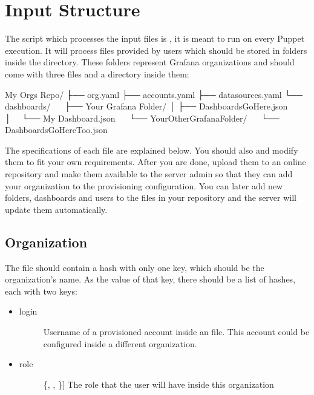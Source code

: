 \documentclass[letterpaper,10pt,english]{sphinxmanual}
\begin{document}
\section{Input Structure}
\label{\detokenize{inputStructure:input-structure}}\label{\detokenize{inputStructure:id1}}
The script which processes the input files is , it is meant to run
on every Puppet execution. It will process files provided by users which should
be stored in folders inside the  directory. These folders represent
Grafana organizations and should come with three files and a directory inside
them:

\begin{sphinxVerbatim}[commandchars=\\\{\}]
My Org\PYGZsq{}s Repo/
├── org.yaml
├── accounts.yaml
├── datasources.yaml
└── dashboards/
    ├── Your Grafana Folder/
    │   ├── DashboardsGoHere.json
    │   └── My Dashboard.json
    └── YourOtherGrafanaFolder/
        └── DashboardsGoHereToo.json
\end{sphinxVerbatim}

The specifications of each file are explained below. You should also
 and
modify them to fit your own requirements.
After you are done, upload them to an online repository and make them available
to the server admin so that they can add your organization to the provisioning
configuration. You can later add new folders, dashboards and users to the files
in your repository and the server will update them automatically.


\subsection{Organization}
\label{\detokenize{inputStructure:organization}}
The  file should contain a hash with only one key, which should be
the organization’s name. As the value of that key, there should be a list of
hashes, each with two keys:
\begin{itemize}
\item {} \begin{description}
\item[{login}] \leavevmode{[}\sphinxtitleref{str}{]}
Username of a provisioned account inside an  file. This
account could be configured inside a different organization.

\end{description}

\item {} \begin{description}
\item[{role}] \leavevmode{[}\{, , \}{]}
The role that the user will have inside this organization

\end{description}

\end{itemize}
\end{document}
